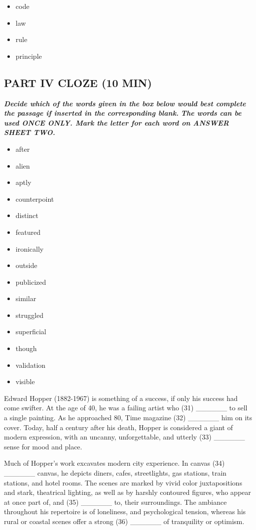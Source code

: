 \documentclass[UTF8,11pt]{ctexart}
\begin{document}
\begin{itemize}[leftmargin=2em,itemsep=.2em,topsep=.4em]\item[A.] code
\item[B.] law
\item[C.] rule
\item[D.] principle
\end{itemize}

\subsection*{\textbf{PART IV CLOZE (10 MIN)}}


\textbf{\textit{Decide which of the words given in the box below would best complete the passage if inserted in the corresponding blank.}} \textbf{\textit{The words can be used ONCE ONLY. Mark the letter for each word on ANSWER SHEET TWO.}}


\begin{itemize}[leftmargin=2em,itemsep=.2em,topsep=.4em]\item[A.] after
\item[B.] alien
\item[C.] aptly
\item[D.] counterpoint
\item[E.] distinct
\item[F.] featured
\item[G.] ironically
\item[H.] outside
\item[I.] publicized
\item[J.] similar
\item[K.] struggled
\item[L.] superficial
\item[M.] though
\item[N.] validation
\item[O.] visible
\end{itemize}

Edward Hopper (1882-1967) is something of a success, if only his success had come swifter. At the age of 40, he was a failing artist who (31) \_\_\_\_\_\_ to sell a single painting. As he approached 80, Time magazine (32) \_\_\_\_\_\_ him on its cover. Today, half a century after his death, Hopper is considered a giant of modern expression, with an uncanny, unforgettable, and utterly (33) \_\_\_\_\_\_ sense for mood and place.


Much of Hopper’s work excavates modern city experience. In canvas (34) \_\_\_\_\_\_ canvas, he depicts diners, cafes, streetlights, gas stations, train stations, and hotel rooms. The scenes are marked by vivid color juxtapositions and stark, theatrical lighting, as well as by harshly contoured figures, who appear at once part of, and (35) \_\_\_\_\_\_ to, their surroundings. The ambiance throughout his repertoire is of loneliness, and psychological tension, whereas his rural or coastal scenes offer a strong (36) \_\_\_\_\_\_ of tranquility or optimism.
\end{document}
